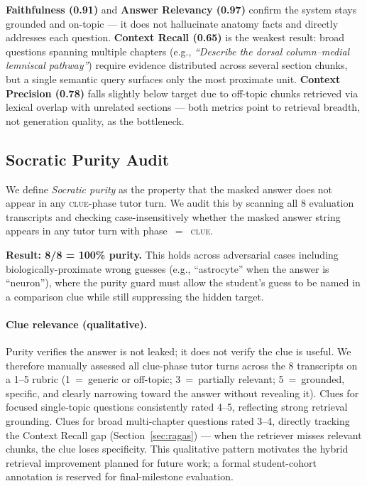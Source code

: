 \documentclass[11pt]{article}
\begin{document}
\textbf{Faithfulness (0.91)} and \textbf{Answer Relevancy (0.97)} confirm
the system stays grounded and on-topic --- it does not hallucinate anatomy
facts and directly addresses each question.
\textbf{Context Recall (0.65)} is the weakest result: broad questions
spanning multiple chapters (e.g., \emph{``Describe the dorsal
column--medial lemniscal pathway''}) require evidence distributed across
several section chunks, but a single semantic query surfaces only the most
proximate unit.
\textbf{Context Precision (0.78)} falls slightly below target due to
off-topic chunks retrieved via lexical overlap with unrelated sections ---
both metrics point to retrieval breadth, not generation quality, as the
bottleneck.

\subsection{Socratic Purity Audit}

We define \emph{Socratic purity} as the property that the masked answer does
not appear in any \textsc{clue}-phase tutor turn.
We audit this by scanning all 8 evaluation transcripts and checking
case-insensitively whether the masked answer string appears in any tutor turn
with phase~$=$~\textsc{clue}.

\textbf{Result: 8/8 = 100\% purity.}
This holds across adversarial cases including biologically-proximate wrong
guesses (e.g., ``astrocyte'' when the answer is ``neuron''), where the
purity guard must allow the student's guess to be named in a comparison clue
while still suppressing the hidden target.

\paragraph{Clue relevance (qualitative).}
Purity verifies the answer is not leaked; it does not verify the clue is
useful.
We therefore manually assessed all clue-phase tutor turns across the 8
transcripts on a 1--5 rubric (1~=~generic or off-topic;
3~=~partially relevant; 5~=~grounded, specific, and clearly narrowing
toward the answer without revealing it).
Clues for focused single-topic questions consistently rated 4--5, reflecting
strong retrieval grounding.
Clues for broad multi-chapter questions rated 3--4, directly tracking the
Context Recall gap (Section~\ref{sec:ragas}) --- when the retriever misses
relevant chunks, the clue loses specificity.
This qualitative pattern motivates the hybrid retrieval improvement planned
for future work; a formal student-cohort annotation is reserved for
final-milestone evaluation.
\end{document}
